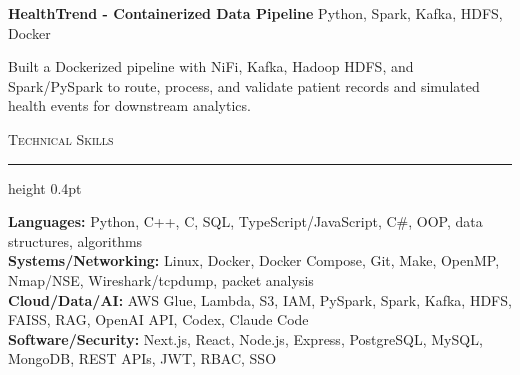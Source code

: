 \documentclass[letterpaper,11pt]{article}
\newcommand{\resumesection}[1]{%
  \par\vspace{2pt}%
  {\large\scshape #1}\par\vspace{2pt}%
  \hrule height 0.4pt\vspace{2pt}%
}
\newcommand{\projectHeading}[2]{
  \textbf{#1} \hfill #2
}
\begin{document}
\projectHeading{HealthTrend - Containerized Data Pipeline}{Python, Spark, Kafka, HDFS, Docker}
\begin{tightitemize}
  \item Built a Dockerized pipeline with NiFi, Kafka, Hadoop HDFS, and Spark/PySpark to route, process, and validate patient records and simulated health events for downstream analytics.
\end{tightitemize}

\resumesection{Technical Skills}
\textbf{Languages:} Python, C++, C, SQL, TypeScript/JavaScript, C\#, OOP, data structures, algorithms\\
\textbf{Systems/Networking:} Linux, Docker, Docker Compose, Git, Make, OpenMP, Nmap/NSE, Wireshark/tcpdump, packet analysis\\
\textbf{Cloud/Data/AI:} AWS Glue, Lambda, S3, IAM, PySpark, Spark, Kafka, HDFS, FAISS, RAG, OpenAI API, Codex, Claude Code\\
\textbf{Software/Security:} Next.js, React, Node.js, Express, PostgreSQL, MySQL, MongoDB, REST APIs, JWT, RBAC, SSO
\end{document}
